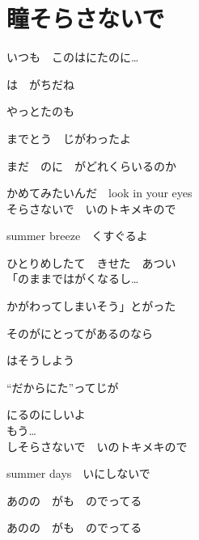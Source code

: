 \section{ 瞳そらさないで}
\large{

いつも　このはにたのに…

は　がちだね

やっとたのも

までとう　じがわったよ

まだ　のに　がどれくらいるのか

かめてみたいんだ　look in your eyes
\\

そらさないで　いのトキメキので

summer breeze　くすぐるよ

ひとりめしたて　きせた　あつい
\\

「のままではがくなるし…

かがわってしまいそう」とがった

そのがにとってがあるのなら

はそうしよう

“だからにた”ってじが

にるのにしいよ
\\

もう…
\\

しそらさないで　いのトキメキので

summer days　いにしないで

あのの　がも　のでってる

あのの　がも　のでってる

}